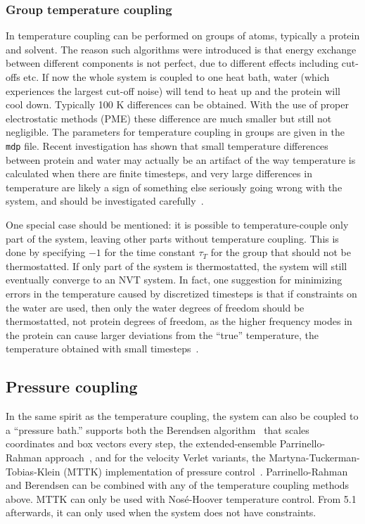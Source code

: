 
\subsubsection{Group temperature coupling}%
In {\gromacs} temperature coupling can be performed on groups of
atoms, typically a protein and solvent. The reason such algorithms
were introduced is that energy exchange between different components
is not perfect, due to different effects including cut-offs etc. If
now the whole system is coupled to one heat bath, water (which
experiences the largest cut-off noise) will tend to heat up and the
protein will cool down. Typically 100 K differences can be obtained.
With the use of proper electrostatic methods (PME) these difference
are much smaller but still not negligible.  The parameters for
temperature coupling in groups are given in the {\tt mdp} file.
Recent investigation has shown that small temperature differences
between protein and water may actually be an artifact of the way
temperature is calculated when there are finite timesteps, and very
large differences in temperature are likely a sign of something else
seriously going wrong with the system, and should be investigated
carefully~\cite{Eastwood2010}.

One special case should be mentioned: it is possible to temperature-couple only
part of the system, leaving other parts without temperature
coupling. This is done by specifying ${-1}$ for the time constant
$\tau_T$ for the group that should not be thermostatted.  If only
part of the system is thermostatted, the system will still eventually
converge to an NVT system.  In fact, one suggestion for minimizing
errors in the temperature caused by discretized timesteps is that if
constraints on the water are used, then only the water degrees of
freedom should be thermostatted, not protein degrees of freedom, as
the higher frequency modes in the protein can cause larger deviations
from the ``true'' temperature, the temperature obtained with small
timesteps~\cite{Eastwood2010}.

\subsection{Pressure coupling}
In the same spirit as the temperature coupling, the system can also be
coupled to a ``pressure bath.'' {\gromacs} supports both the Berendsen
algorithm~\cite{Berendsen84} that scales coordinates and box vectors
every step, the extended-ensemble Parrinello-Rahman approach~\cite{Parrinello81,Nose83}, and for
the velocity Verlet variants, the Martyna-Tuckerman-Tobias-Klein
(MTTK) implementation of pressure
control~\cite{Martyna1996}. Parrinello-Rahman and Berendsen can be
combined with any of the temperature coupling methods above. MTTK can
only be used with Nos{\'e}-Hoover temperature control. From 5.1 afterwards,
it can only used when the system does not have constraints.

